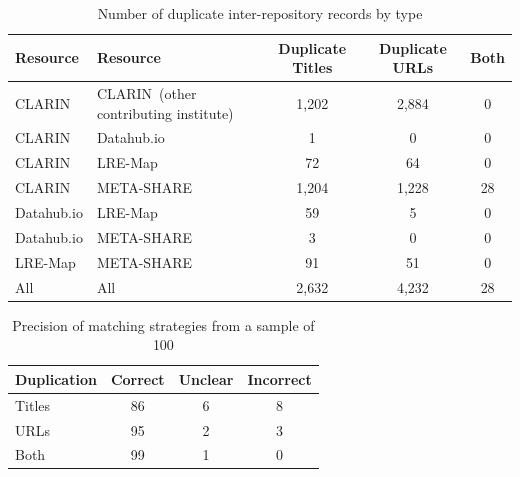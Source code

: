 \documentclass[smallextended]{svjour3}       %
\begin{document}
\begin{table}
    \begin{center}
        \begin{tabular}{lp{35mm}ccc}
            \toprule
        Resource    & Resource    & Duplicate Titles & Duplicate URLs & Both \\
        \midrule                                                                  
        CLARIN      & CLARIN{\tiny~(other contributing institute)}      & 1,202            & 2,884          & 0    \\
        CLARIN      & Datahub.io  & 1                & 0              & 0    \\
        CLARIN      & LRE-Map     & 72               & 64             & 0    \\
        CLARIN      & META-SHARE  & 1,204            & 1,228          & 28    \\
        Datahub.io  & LRE-Map     & 59               & 5              & 0    \\
        Datahub.io  & META-SHARE  & 3                & 0              & 0    \\
        LRE-Map     & META-SHARE  & 91               & 51             & 0    \\
        \midrule
        All         & All         & 2,632            & 4,232          & 28   \\
        \bottomrule
        \end{tabular}
    \end{center}
    \caption{\label{tab:dupes}Number of duplicate inter-repository records by type}
\end{table}

\begin{table}
    \begin{tabular}{lccc}
        \toprule
        Duplication & Correct & Unclear & Incorrect \\
        \midrule                  
        Titles      &    86   &   6     &    8      \\ 
        URLs        &    95   &   2     &    3      \\
        Both        &    99   &   1     &    0      \\
        \bottomrule
    \end{tabular}
    \caption{\label{tab:dupe-precision}Precision of matching strategies from a
    sample of 100}
\end{table}
\end{document}
